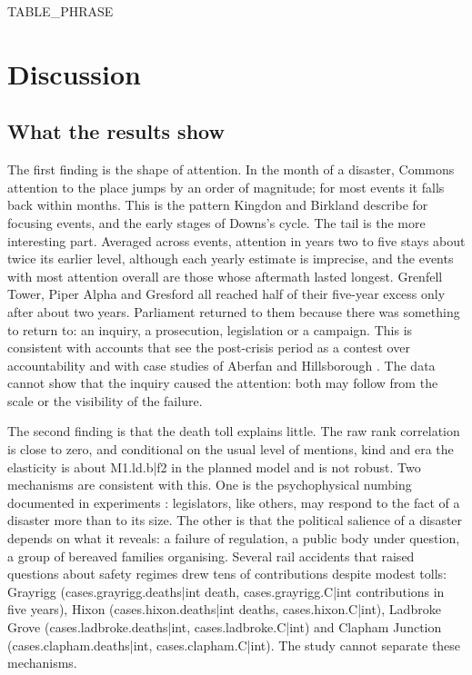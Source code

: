 \documentclass[11pt,a4paper]{article}
\begin{document}
{{TABLE_PHRASE}}

\section{Discussion}
\label{sec:discussion}
\subsection{What the results show}
The first finding is the shape of attention. In the month of a disaster, Commons attention to the place jumps by an order of magnitude; for most events it falls back within months. This is the pattern Kingdon and Birkland describe for focusing events, and the early stages of Downs's cycle. The tail is the more interesting part. Averaged across events, attention in years two to five stays about twice its earlier level, although each yearly estimate is imprecise, and the events with most attention overall are those whose aftermath lasted longest. Grenfell Tower, Piper Alpha and Gresford all reached half of their five-year excess only after about two years. Parliament returned to them because there was something to return to: an inquiry, a prosecution, legislation or a campaign. This is consistent with accounts that see the post-crisis period as a contest over accountability \citep{Boin2009,Hood2011} and with case studies of Aberfan and Hillsborough \citep{McLeanJohnes2000,Scraton1999}. The data cannot show that the inquiry caused the attention: both may follow from the scale or the visibility of the failure.

The second finding is that the death toll explains little. The raw rank correlation is close to zero, and conditional on the usual level of mentions, kind and era the elasticity is about {{M1.ld.b|f2}} in the planned model and is not robust. Two mechanisms are consistent with this. One is the psychophysical numbing documented in experiments \citep{Fetherstonhaugh1997,Slovic2007}: legislators, like others, may respond to the fact of a disaster more than to its size. The other is that the political salience of a disaster depends on what it reveals: a failure of regulation, a public body under question, a group of bereaved families organising. Several rail accidents that raised questions about safety regimes drew tens of contributions despite modest tolls: Grayrigg ({{cases.grayrigg.deaths|int}} death, {{cases.grayrigg.C|int}} contributions in five years), Hixon ({{cases.hixon.deaths|int}} deaths, {{cases.hixon.C|int}}), Ladbroke Grove ({{cases.ladbroke.deaths|int}}, {{cases.ladbroke.C|int}}) and Clapham Junction ({{cases.clapham.deaths|int}}, {{cases.clapham.C|int}}). The study cannot separate these mechanisms.
\end{document}
